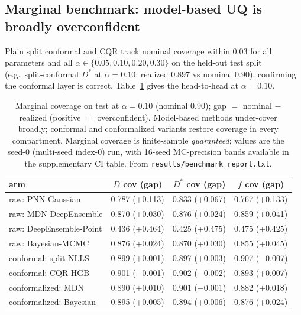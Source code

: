 \documentclass[11pt]{article}
\newcommand{\Dstar}{D^{*}}
\begin{document}
\subsection{Marginal benchmark: model-based UQ is broadly overconfident}
\label{sec:marginal}
Plain split conformal and CQR track nominal coverage within $0.03$ for all
parameters and all $\alpha\in\{0.05,0.10,0.20,0.30\}$ on the held-out test split
(e.g.\ split-conformal $\Dstar$ at $\alpha{=}0.10$: realized $0.897$ vs nominal
$0.90$), confirming the conformal layer is correct. Table~\ref{tab:marginal} gives
the head-to-head at $\alpha=0.10$.

\begin{table}[t]
\centering
\caption{Marginal coverage on test at $\alpha=0.10$ (nominal $0.90$); gap $=$
nominal $-$ realized (positive $=$ overconfident). Model-based methods under-cover
broadly; conformal and conformalized variants restore coverage in every
compartment. Marginal coverage is finite-sample \emph{guaranteed}; values are the
seed-0 (multi-seed index-0) run, with 16-seed MC-precision bands available in the
supplementary CI table. From \texttt{results/benchmark\_report.txt}.}
\label{tab:marginal}
\small
\begin{tabular}{lccc}
\toprule
arm & $D$ cov (gap) & $\Dstar$ cov (gap) & $f$ cov (gap) \\
\midrule
raw: PNN-Gaussian        & 0.787 (+0.113) & 0.833 (+0.067) & 0.767 (+0.133) \\
raw: MDN-DeepEnsemble    & 0.870 (+0.030) & 0.876 (+0.024) & 0.859 (+0.041) \\
raw: DeepEnsemble-Point  & 0.436 (+0.464) & 0.425 (+0.475) & 0.475 (+0.425) \\
raw: Bayesian-MCMC       & 0.876 (+0.024) & 0.870 (+0.030) & 0.855 (+0.045) \\
\midrule
conformal: split-NLLS    & 0.899 (+0.001) & 0.897 (+0.003) & 0.907 ($-$0.007) \\
conformal: CQR-HGB       & 0.901 ($-$0.001) & 0.902 ($-$0.002) & 0.893 (+0.007) \\
conformalized: MDN       & 0.890 (+0.010) & 0.901 ($-$0.001) & 0.882 (+0.018) \\
conformalized: Bayesian  & 0.895 (+0.005) & 0.894 (+0.006) & 0.876 (+0.024) \\
\bottomrule
\end{tabular}
\end{table}
\end{document}
